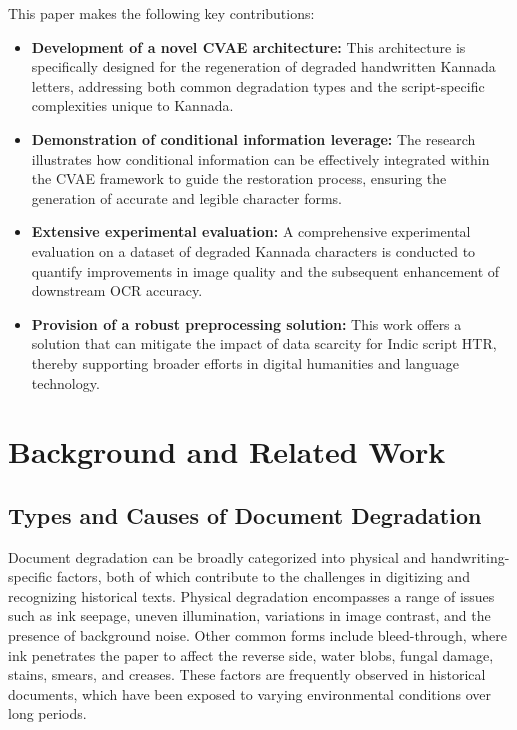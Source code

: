 \documentclass[conference]{IEEEtran}
\begin{document}
This paper makes the following key contributions:
\begin{itemize}[noitemsep,topsep=0pt,parsep=0pt,partopsep=0pt]
    \item \textbf{Development of a novel CVAE architecture:} This architecture is specifically designed for the regeneration of degraded handwritten Kannada letters, addressing both common degradation types and the script-specific complexities unique to Kannada.
    \item \textbf{Demonstration of conditional information leverage:} The research illustrates how conditional information can be effectively integrated within the CVAE framework to guide the restoration process, ensuring the generation of accurate and legible character forms.
    \item \textbf{Extensive experimental evaluation:} A comprehensive experimental evaluation on a dataset of degraded Kannada characters is conducted to quantify improvements in image quality and the subsequent enhancement of downstream OCR accuracy.
    \item \textbf{Provision of a robust preprocessing solution:} This work offers a solution that can mitigate the impact of data scarcity for Indic script HTR, thereby supporting broader efforts in digital humanities and language technology.
\end{itemize}

\section{Background and Related Work}

\subsection{Types and Causes of Document Degradation}
\justify
Document degradation can be broadly categorized into physical and handwriting-specific factors, both of which contribute to the challenges in digitizing and recognizing historical texts. Physical degradation encompasses a range of issues such as ink seepage, uneven illumination, variations in image contrast, and the presence of background noise.\cite{Davis2020} Other common forms include bleed-through, where ink penetrates the paper to affect the reverse side, water blobs, fungal damage, stains, smears, and creases. These factors are frequently observed in historical documents, which have been exposed to varying environmental conditions over long periods.\cite{Davis2020, Emuru2023, Ahmed2024}
\end{document}
